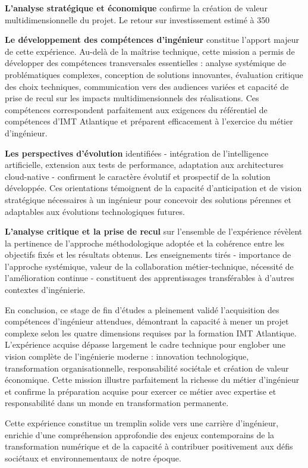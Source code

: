 \textbf{L'analyse stratégique et économique} confirme la création de valeur multidimensionnelle du projet. Le retour sur investissement estimé à 350%

\textbf{Le développement des compétences d'ingénieur} constitue l'apport majeur de cette expérience. Au-delà de la maîtrise technique, cette mission a permis de développer des compétences transversales essentielles : analyse systémique de problématiques complexes, conception de solutions innovantes, évaluation critique des choix techniques, communication vers des audiences variées et capacité de prise de recul sur les impacts multidimensionnels des réalisations. Ces compétences correspondent parfaitement aux exigences du référentiel de compétences d'IMT Atlantique et préparent efficacement à l'exercice du métier d'ingénieur.

\textbf{Les perspectives d'évolution} identifiées - intégration de l'intelligence artificielle, extension aux tests de performance, adaptation aux architectures cloud-native - confirment le caractère évolutif et prospectif de la solution développée. Ces orientations témoignent de la capacité d'anticipation et de vision stratégique nécessaires à un ingénieur pour concevoir des solutions pérennes et adaptables aux évolutions technologiques futures.

\textbf{L'analyse critique et la prise de recul} sur l'ensemble de l'expérience révèlent la pertinence de l'approche méthodologique adoptée et la cohérence entre les objectifs fixés et les résultats obtenus. Les enseignements tirés - importance de l'approche systémique, valeur de la collaboration métier-technique, nécessité de l'amélioration continue - constituent des apprentissages transférables à d'autres contextes d'ingénierie.

En conclusion, ce stage de fin d'études a pleinement validé l'acquisition des compétences d'ingénieur attendues, démontrant la capacité à mener un projet complexe selon les quatre dimensions requises par la formation IMT Atlantique. L'expérience acquise dépasse largement le cadre technique pour englober une vision complète de l'ingénierie moderne : innovation technologique, transformation organisationnelle, responsabilité sociétale et création de valeur économique. Cette mission illustre parfaitement la richesse du métier d'ingénieur et confirme la préparation acquise pour exercer ce métier avec expertise et responsabilité dans un monde en transformation permanente.

Cette expérience constitue un tremplin solide vers une carrière d'ingénieur, enrichie d'une compréhension approfondie des enjeux contemporains de la transformation numérique et de la capacité à contribuer positivement aux défis sociétaux et environnementaux de notre époque.